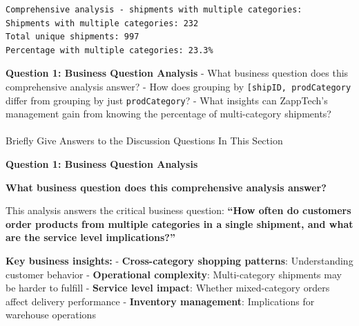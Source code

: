 \documentclass[
  letterpaper,
  DIV=11,
  numbers=noendperiod]{scrartcl}
\makeatletter
\let\oldparagraph\paragraph
\renewcommand{\paragraph}{
    \@ifstar
      \xxxParagraphStar
      \xxxParagraphNoStar
  }
\newcommand{\xxxParagraphStar}[1]{\oldparagraph*{#1}\mbox{}}
\newcommand{\xxxParagraphNoStar}[1]{\oldparagraph{#1}\mbox{}}
\makeatother
\begin{document}
\begin{verbatim}
Comprehensive analysis - shipments with multiple categories:
Shipments with multiple categories: 232
Total unique shipments: 997
Percentage with multiple categories: 23.3%
\end{verbatim}

\begin{tcolorbox}[enhanced jigsaw, bottomtitle=1mm, opacitybacktitle=0.6, toptitle=1mm, colbacktitle=quarto-callout-important-color!10!white, breakable, coltitle=black, bottomrule=.15mm, left=2mm, colframe=quarto-callout-important-color-frame, colback=white, title=\textcolor{quarto-callout-important-color}{\faExclamation}\hspace{0.5em}{🤔 Discussion Questions: Answering A Business Question}, leftrule=.75mm, arc=.35mm, rightrule=.15mm, opacityback=0, toprule=.15mm, titlerule=0mm]

\textbf{Question 1: Business Question Analysis} - What business question
does this comprehensive analysis answer? - How does grouping by
\texttt{{[}\textquotesingle{}shipID\textquotesingle{},\ \textquotesingle{}prodCategory\textquotesingle{}{]}}
differ from grouping by just
\texttt{\textquotesingle{}prodCategory\textquotesingle{}}? - What
insights can ZappTech's management gain from knowing the percentage of
multi-category shipments?

\end{tcolorbox}

\paragraph{Briefly Give Answers to the Discussion Questions In This
Section}\label{briefly-give-answers-to-the-discussion-questions-in-this-section-7}

\textbf{Question 1: Business Question Analysis}

\textbf{What business question does this comprehensive analysis answer?}

This analysis answers the critical business question: \textbf{``How
often do customers order products from multiple categories in a single
shipment, and what are the service level implications?''}

\textbf{Key business insights:} - \textbf{Cross-category shopping
patterns}: Understanding customer behavior - \textbf{Operational
complexity}: Multi-category shipments may be harder to fulfill -
\textbf{Service level impact}: Whether mixed-category orders affect
delivery performance - \textbf{Inventory management}: Implications for
warehouse operations
\end{document}
